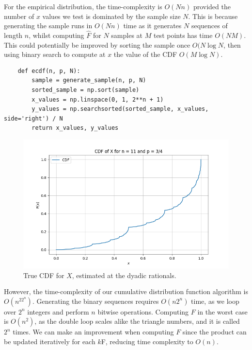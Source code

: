 \documentclass{article}
\begin{document}
For the empirical distribution, the time-complexity is \(O(Nn)\) provided the number of \(x\) values we test is dominated by the sample size \(N\). This is because generating the sample runs in \(O(Nn)\) time as it generates \(N\) sequences of length \(n\), whilst computing \(\hat{F}\) for \(N\) samples at \(M\) test points has time \(O(NM)\). This could potentially be improved by sorting the sample once \(O(N\log N\), then using binary search to compute at \(x\) the value of the CDF \(O(M\log N)\).

\begin{verbatim}
    def ecdf(n, p, N):
        sample = generate_sample(n, p, N)
        sorted_sample = np.sort(sample)
        x_values = np.linspace(0, 1, 2**n + 1)
        y_values = np.searchsorted(sorted_sample, x_values, side='right') / N
        return x_values, y_values
\end{verbatim}

\begin{figure}
    \centering
    \includegraphics[width=1.0\linewidth]{images/truecdf.png}
    \caption{True CDF for \(X\), estimated at the dyadic rationals.}
\end{figure}

However, the time-complexity of our cumulative distribution function algorithm is \(O(n^22^n)\). Generating the binary sequences requires \(O(n2^n)\) time, as we loop over \(2^n\) integers and perform \(n\) bitwise operations. Computing \(F\) in the worst case is \(O(n^2)\), as the double loop scales alike the triangle numbers, and it is called \(2^n\) times. We can make an improvement when computing \(F\) since the product can be updated iteratively for each \(k\)F, reducing time complexity to \(O(n)\). 
\end{document}
